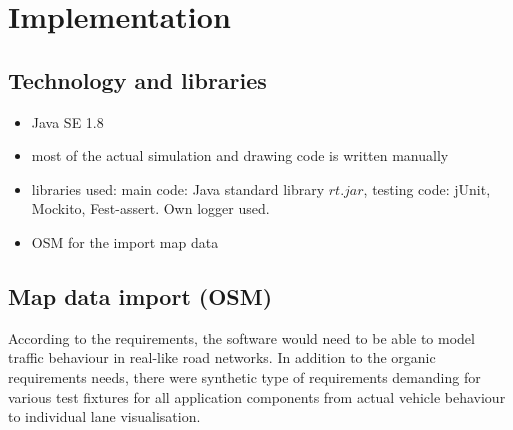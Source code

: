 

\section{Implementation}

\subsection{Technology and libraries}
\begin{itemize}
    \item Java SE 1.8
    \item most of the actual simulation and drawing code is written manually
    \item libraries used: main code: Java standard library \(rt.jar\), testing code: jUnit, Mockito, Fest-assert. Own logger used.
    \item OSM for the import map data
\end{itemize}

\subsection{Map data import (OSM)}
According to the requirements, the software would need to be able to model traffic behaviour in real-like road networks. In addition to the organic requirements needs, there were synthetic type of requirements demanding for various test fixtures for all application components from actual vehicle behaviour to individual lane visualisation.

